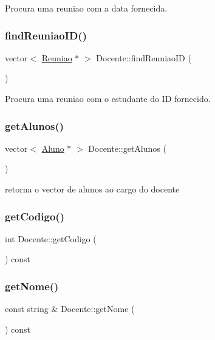 Procura uma reuniao com a data fornecida. \hypertarget{class_docente_a75f4bb31ccff54cc38c34dbb333708df}{}\label{class_docente_a75f4bb31ccff54cc38c34dbb333708df} 
\subsubsection{\texorpdfstring{find\+Reuniao\+I\+D()}{findReuniaoID()}}
{\footnotesize\ttfamily vector$<$ \hyperlink{class_reuniao}{Reuniao} $\ast$ $>$ Docente\+::find\+Reuniao\+ID (\begin{DoxyParamCaption}{ }\end{DoxyParamCaption})}

Procura uma reuniao com o estudante do ID fornecido. \hypertarget{class_docente_accbc43c2e9c79d2adbc6d49fe8de9697}{}\label{class_docente_accbc43c2e9c79d2adbc6d49fe8de9697} 
\subsubsection{\texorpdfstring{get\+Alunos()}{getAlunos()}}
{\footnotesize\ttfamily vector$<$ \hyperlink{class_aluno}{Aluno} $\ast$ $>$ Docente\+::get\+Alunos (\begin{DoxyParamCaption}{ }\end{DoxyParamCaption})}

retorna o vector de alunos ao cargo do docente \hypertarget{class_docente_a9973620c09d6d48dc1871db5f0a9cd5b}{}\label{class_docente_a9973620c09d6d48dc1871db5f0a9cd5b} 
\subsubsection{\texorpdfstring{get\+Codigo()}{getCodigo()}}
{\footnotesize\ttfamily int Docente\+::get\+Codigo (\begin{DoxyParamCaption}{ }\end{DoxyParamCaption}) const}

\hypertarget{class_docente_ae9660cce3a01db623da50009781b0b77}{}\label{class_docente_ae9660cce3a01db623da50009781b0b77} 
\subsubsection{\texorpdfstring{get\+Nome()}{getNome()}}
{\footnotesize\ttfamily const string \& Docente\+::get\+Nome (\begin{DoxyParamCaption}{ }\end{DoxyParamCaption}) const}


